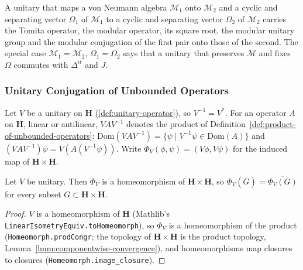 A unitary that maps a von Neumann algebra $\mathcal{M}_1$ onto $\mathcal{M}_2$ and a cyclic and separating vector $\Omega_1$ of $\mathcal{M}_1$ to a cyclic and separating vector $\Omega_2$ of $\mathcal{M}_2$ carries the Tomita operator, the modular operator, its square root, the modular unitary group and the modular conjugation of the first pair onto those of the second. The special case $\mathcal{M}_1 = \mathcal{M}_2$, $\Omega_1 = \Omega_2$ says that a unitary that preserves $\mathcal{M}$ and fixes $\Omega$ commutes with $\Delta^{it}$ and $J$.

\subsubsection{Unitary Conjugation of Unbounded Operators}

Let $V$ be a unitary on $\mathbf{H}$ (\ref{def:unitary-operator}), so $V^{-1} = V^*$. For an operator $A$ on $\mathbf{H}$, linear or antilinear, $VAV^{-1}$ denotes the product of Definition~\ref{def:product-of-unbounded-operators}: $\text{Dom}(VAV^{-1}) = \{ \psi \mid V^{-1}\psi \in \text{Dom}(A) \}$ and $(VAV^{-1})\psi = V(A(V^{-1}\psi))$. Write $\Phi_V(\phi, \psi) = (V\phi, V\psi)$ for the induced map of $\mathbf{H} \times \mathbf{H}$.

\begin{lemma}
    \label{lmm:unitary-conjugate-graph}
    \leanok
    Let $V$ be unitary. Then $\Phi_V$ is a homeomorphism of $\mathbf{H} \times \mathbf{H}$, so $\Phi_V(\overline{G}) = \overline{\Phi_V(G)}$ for every subset $G \subset \mathbf{H} \times \mathbf{H}$.
\end{lemma}
\begin{proof}
    \leanok
    $V$ is a homeomorphism of $\mathbf{H}$ (Mathlib's \texttt{LinearIsometryEquiv.toHomeomorph}), so $\Phi_V$ is a homeomorphism of the product (\texttt{Homeomorph.prodCongr}; the topology of $\mathbf{H} \times \mathbf{H}$ is the product topology, Lemma~\ref{lmm:componentwise-convergence}), and homeomorphisms map closures to closures (\texttt{Homeomorph.image\_closure}).
\end{proof}

